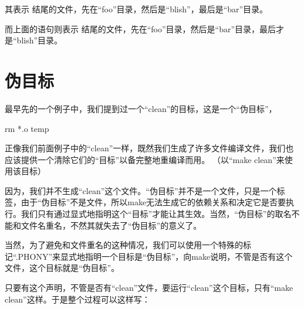 \documentclass[a4paper,10pt]{sphinxmanual}
\begin{document}
\begin{sphinxVerbatim}[commandchars=\\\{\}]
\end{sphinxVerbatim}

其表示   结尾的文件，先在“foo”目录，然后是“blish”，最后是“bar”目录。

\begin{sphinxVerbatim}[commandchars=\\\{\}]
\end{sphinxVerbatim}

而上面的语句则表示  结尾的文件，先在“foo”目录，然后是“bar”目录，最后才是“blish”目录。


\section{伪目标}
\label{\detokenize{rules:id6}}
最早先的一个例子中，我们提到过一个“clean”的目标，这是一个“伪目标”，

\begin{sphinxVerbatim}[commandchars=\\\{\}]
    rm *.o temp
\end{sphinxVerbatim}

正像我们前面例子中的“clean”一样，既然我们生成了许多文件编译文件，我们也应该提供一个清除它们的“目标”以备完整地重编译而用。 （以“make clean”来使用该目标）

因为，我们并不生成“clean”这个文件。“伪目标”并不是一个文件，只是一个标签，由于“伪目标”不是文件，所以make无法生成它的依赖关系和决定它是否要执行。我们只有通过显式地指明这个“目标”才能让其生效。当然，“伪目标”的取名不能和文件名重名，不然其就失去了“伪目标”的意义了。

当然，为了避免和文件重名的这种情况，我们可以使用一个特殊的标记“.PHONY”来显式地指明一个目标是“伪目标”，向make说明，不管是否有这个文件，这个目标就是“伪目标”。

\begin{sphinxVerbatim}[commandchars=\\\{\}]
 
\end{sphinxVerbatim}

只要有这个声明，不管是否有“clean”文件，要运行“clean”这个目标，只有“make clean”这样。于是整个过程可以这样写：
\end{document}
